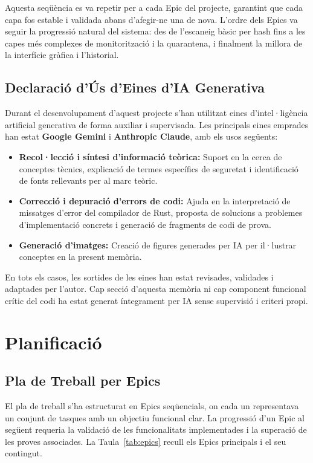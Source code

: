 \documentclass[12pt,a4paper]{report}
\begin{document}
Aquesta seqüència es va repetir per a cada Epic del projecte, garantint que cada capa fos estable i validada abans d'afegir-ne una de nova. L'ordre dels Epics va seguir la progressió natural del sistema: des de l'escaneig bàsic per hash fins a les capes més complexes de monitorització i la quarantena, i finalment la millora de la interfície gràfica i l'historial.

\section{Declaració d'Ús d'Eines d'IA Generativa}
Durant el desenvolupament d'aquest projecte s'han utilitzat eines d'intel·ligència artificial generativa de forma auxiliar i supervisada. Les principals eines emprades han estat \textbf{Google Gemini} i \textbf{Anthropic Claude}, amb els usos següents:

\begin{itemize}
    \item \textbf{Recol·lecció i síntesi d'informació teòrica:} Suport en la cerca de conceptes tècnics, explicació de termes específics de seguretat i identificació de fonts rellevants per al marc teòric.
    \item \textbf{Correcció i depuració d'errors de codi:} Ajuda en la interpretació de missatges d'error del compilador de Rust, proposta de solucions a problemes d'implementació concrets i generació de fragments de codi de prova.
    \item \textbf{Generació d'imatges:} Creació de figures generades per IA per il·lustrar conceptes en la present memòria.
\end{itemize}

En tots els casos, les sortides de les eines han estat revisades, validades i adaptades per l'autor. Cap secció d'aquesta memòria ni cap component funcional crític del codi ha estat generat íntegrament per IA sense supervisió i criteri propi.


\chapter{Planificació}
\label{ch:planificacio}

\section{Pla de Treball per Epics}
El pla de treball s'ha estructurat en Epics seqüencials, on cada un representava un conjunt de tasques amb un objectiu funcional clar. La progressió d'un Epic al següent requeria la validació de les funcionalitats implementades i la superació de les proves associades. La Taula~\ref{tab:epics} recull els Epics principals i el seu contingut.
\end{document}

